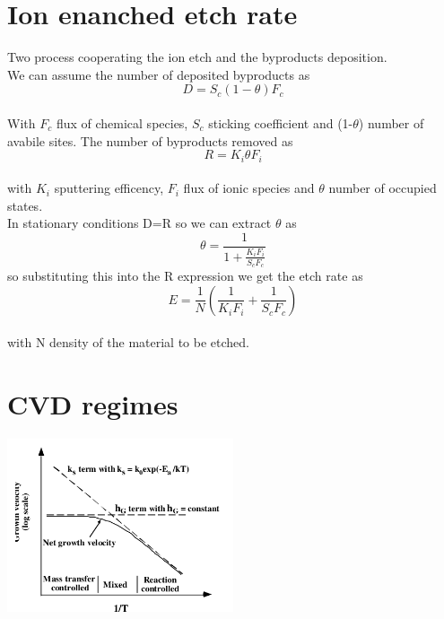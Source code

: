 
\section{Ion enanched etch rate}

Two process cooperating the ion etch and the byproducts deposition.\\
We can assume the number of deposited byproducts as
\begin{equation}
D=S_c(1-\theta)F_c
\end{equation}
\\
With $F_c$ flux of chemical species, $S_c$ sticking coefficient and (1-$\theta$) number of avabile sites.
The number of byproducts removed as
\begin{equation}
R=K_i\theta F_i
\end{equation}
\\
with $K_i$ sputtering efficency, $F_i$ flux of ionic species and $\theta$ number of occupied states.\\

In stationary conditions D=R so we can extract $\theta$ as
\begin{equation}
\theta=\frac{1}{1+\frac{K_iF_i}{S_cF_c}}
\end{equation}
so substituting this into the R expression we get the etch rate as 
\begin{equation}
E=\frac{1}{N}\left(\frac{1}{K_iF_i}+\frac{1}{S_cF_c}\right)
\end{equation}
\\
with N density of the material to be etched.\\


\section{CVD regimes}

\centering
\includegraphics[width=0.5\textwidth]{CVD.png}\\
\raggedright

